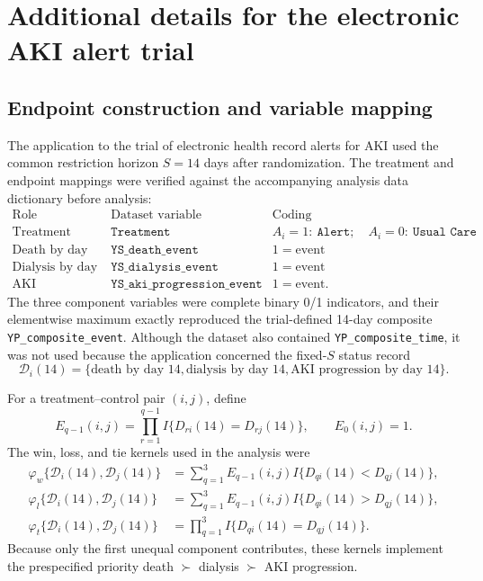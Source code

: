 \section{Additional details for the electronic AKI alert trial}
\label{supp:trial3}

\subsection{Endpoint construction and variable mapping}

The application to the trial of electronic health record alerts for AKI
\citep{wilson2021electronic} used the common restriction horizon $S=14$ days after
randomization. The treatment and endpoint mappings were verified against the accompanying
analysis data dictionary before analysis:
\[
\begin{array}{lll}
\text{Role} & \text{Dataset variable} & \text{Coding}\\
\hline
\text{Treatment} & \texttt{Treatment}
  & A_i=1:\ \texttt{Alert};\quad A_i=0:\ \texttt{Usual Care}\\
\text{Death by day 14} & \texttt{YS\_death\_event} & 1=\text{event}\\
\text{Dialysis by day 14} & \texttt{YS\_dialysis\_event} & 1=\text{event}\\
\text{AKI progression by day 14} & \texttt{YS\_aki\_progression\_event}
  & 1=\text{event}.
\end{array}
\]
The three component variables were complete binary 0/1 indicators, and their elementwise
maximum exactly reproduced the trial-defined 14-day composite
\texttt{YP\_composite\_event}. Although the dataset also contained
\texttt{YP\_composite\_time}, it was not used because the application concerned the
fixed-$S$ status record
\[
  \mathcal D_i(14)
  =
  \{\text{death by day 14},\text{dialysis by day 14},
    \text{AKI progression by day 14}\}.
\]

For a treatment--control pair $(i,j)$, define
\[
  E_{q-1}(i,j)
  =\prod_{r=1}^{q-1}I\{D_{ri}(14)=D_{rj}(14)\},
  \qquad E_0(i,j)=1.
\]
The win, loss, and tie kernels used in the analysis were
\[
\begin{split}
  \varphi_w\{\mathcal D_i(14),\mathcal D_j(14)\}
    &=\sum_{q=1}^3 E_{q-1}(i,j)
      I\{D_{qi}(14)<D_{qj}(14)\},\\
  \varphi_l\{\mathcal D_i(14),\mathcal D_j(14)\}
    &=\sum_{q=1}^3 E_{q-1}(i,j)
      I\{D_{qi}(14)>D_{qj}(14)\},\\
  \varphi_t\{\mathcal D_i(14),\mathcal D_j(14)\}
    &=\prod_{q=1}^3 I\{D_{qi}(14)=D_{qj}(14)\}.
\end{split}
\]
Because only the first unequal component contributes, these kernels implement the
prespecified priority death $\succ$ dialysis $\succ$ AKI progression.

